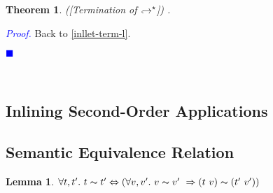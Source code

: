 \documentclass[a4paper,11pt,oneside]{article}
\theoremstyle{plain}
\newtheorem{lemma}[definition]{Lemma}
\newtheorem{theorem}[definition]{Theorem}
\renewenvironment{proof}{\noindent \begin{adjustwidth}{1.5em}{} \textcolor{blue}{\textit{Proof.}}}
{{\begin{tiny}\textcolor{blue}{$\blacksquare$}\end{tiny}}
\end{adjustwidth}~\\\noindent}
\newcommand{\tmapp}[2]{(#1 ~ #2)}
\newcommand{\eqv}[1]{#1 \thicksim #1'}
\newcommand{\hookdownarrow}{\mathrel{\rotatebox[origin=c]{180}{$\hookleftarrow$}}}
\newcommand{\inlletarr}{\hookdownarrow}
\begin{document}
\begin{theorem}([Termination of $\inlletarr^\star$])
\label{inllet-term-p}.
\end{theorem}
\begin{proof}
  Back to \ref{inllet-term-l}.
\end{proof}	
	
	
	
	\subsection{Inlining Second-Order Applications}



	\subsection{Semantic Equivalence Relation}
	\begin{lemma}
		$\forall t,t'.~ \eqv{t} \Leftrightarrow 
			(\forall v, v'.~\eqv{v}~\Rightarrow
			\tmapp{t}{v} \thicksim \tmapp{t'}{v'})$
	\label{equiv-def-p}
	\end{lemma}
\end{document}
